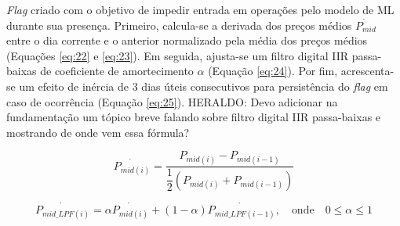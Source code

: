 \begin{itemize}
    \textit{Flag} criado com o objetivo de impedir entrada em operações pelo modelo de ML durante sua presença. Primeiro, calcula-se a derivada dos preços médios \begin{math} \dot{P_{mid}} \end{math} entre o dia corrente e o anterior normalizado pela média dos preços médios (Equações \ref{eq:22} e \ref{eq:23}). Em seguida, ajusta-se um filtro digital IIR passa-baixas de coeficiente de amortecimento \begin{math} \alpha \end{math} (Equação \ref{eq:24}). Por fim, acrescenta-se um efeito de inércia de 3 dias úteis consecutivos para persistência do \textit{flag} em caso de ocorrência (Equação \ref{eq:25}). \color{red} HERALDO: Devo adicionar na fundamentação um tópico breve falando sobre filtro digital IIR passa-baixas e mostrando de onde vem essa fórmula? 

    \begin{equation} \label{eq:23}
        \dot{P_{mid(i)}} = \dfrac{ P_{mid(i)} - P_{mid(i-1)} }{ \dfrac{1}{2}(P_{mid(i)} + P_{mid(i-1)}) }
    \end{equation}

    \begin{equation} \label{eq:24}
        \dot{P_{mid\_LPF(i)}} = \alpha \dot{P_{mid(i)}} + (1 - \alpha) \dot{P_{mid\_LPF(i-1)}},  \quad \textrm{onde} \quad 0 \le \alpha \le 1
    \end{equation}


\end{itemize}
